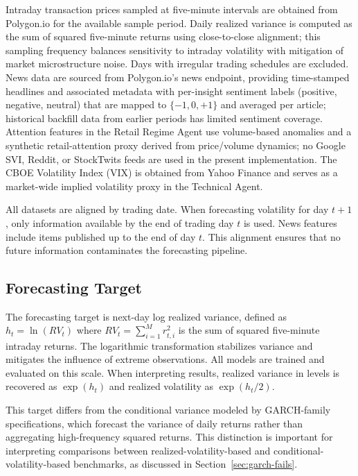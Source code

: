 \documentclass[review]{elsarticle}
\begin{document}
Intraday transaction prices sampled at five-minute intervals are obtained from Polygon.io for the available sample period. Daily realized variance is computed as the sum of squared five-minute returns using close-to-close alignment; this sampling frequency balances sensitivity to intraday volatility with mitigation of market microstructure noise. Days with irregular trading schedules are excluded. News data are sourced from Polygon.io's news endpoint, providing time-stamped headlines and associated metadata with per-insight sentiment labels (positive, negative, neutral) that are mapped to $\{-1,0,+1\}$ and averaged per article; historical backfill data from earlier periods has limited sentiment coverage. %
Attention features in the Retail Regime Agent use volume-based anomalies and a synthetic retail-attention proxy derived from price/volume dynamics; no Google SVI, Reddit, or StockTwits feeds are used in the present implementation. %
The CBOE Volatility Index (VIX) is obtained from Yahoo Finance and serves as a market-wide implied volatility proxy in the Technical Agent.

All datasets are aligned by trading date. When forecasting volatility for day $t{+}1$, only information available by the end of trading day $t$ is used. News features include items published up to the end of day $t$. This alignment ensures that no future information contaminates the forecasting pipeline. %

\subsection{Forecasting Target}\label{forecasting-target-setup}

The forecasting target is next-day log realized variance, defined as $h_t = \ln(RV_t)$ where $RV_t = \sum_{i=1}^{M} r_{t,i}^2$ is the sum of squared five-minute intraday returns. The logarithmic transformation stabilizes variance and mitigates the influence of extreme observations. All models are trained and evaluated on this scale. When interpreting results, realized variance in levels is recovered as $\exp(h_t)$ and realized volatility as $\exp(h_t / 2)$.

This target differs from the conditional variance modeled by GARCH-family specifications, which forecast the variance of daily returns rather than aggregating high-frequency squared returns. This distinction is important for interpreting comparisons between realized-volatility-based and conditional-volatility-based benchmarks, as discussed in Section~\ref{sec:garch-fails}.
\end{document}
